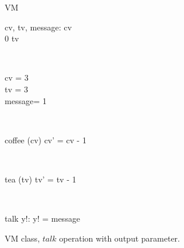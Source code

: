 \begin{figure}[H]
\centering
\begin{class}{VM}
\\
\begin{state}
cv, tv, message: \integer
{} \leq  cv 
\\
0 \leq  tv 
\end{state} 
\\
\begin{init}
cv = 3
\\tv = 3
\\ message= 1
\end{init} 
\\
\begin{op}{coffee}
\Delta (cv)
\ST
cv' = cv - 1
\end{op}
\\
\begin{op}{tea}
\Delta (tv)
\ST
tv' = tv - 1
\end{op}
\\
\begin{op}{talk}
y!: \integer
\ST
y! = message
\end{op}
\end{class}
\caption{VM class, $talk$ operation with output parameter.}
\label{oz_vm_with_operation_input_output_parameters}
\end{figure}